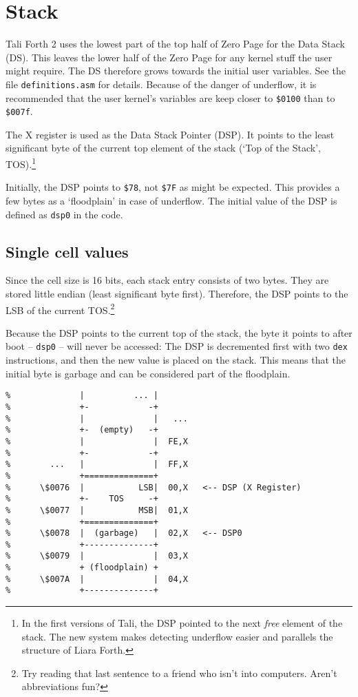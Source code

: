 
\section{Stack}

Tali Forth 2 uses the lowest part of the top half of Zero Page for the Data
Stack (DS). This leaves the lower half of the Zero Page for any kernel stuff the
user might require. The DS therefore grows towards the initial user variables.
See the file \texttt{definitions.asm} for details.  Because of the danger of
underflow, it is recommended that the user kernel's variables are keep closer to
\texttt{\$0100} than to \texttt{\$007f}.

The X register is used as the Data Stack Pointer (DSP). It points to the least
significant byte of the current top element of the stack (`Top of the Stack',
TOS).\footnote{In the first versions of Tali, the DSP pointed to the next
\textit{free} element of the stack. The new system makes detecting underflow
easier and parallels the structure of Liara Forth.}

Initially, the DSP points to \texttt{\$78}, not \texttt{\$7F} as might be
expected. This provides a few bytes as a `floodplain' in case of underflow. The
initial value of the DSP is defined as \texttt{dsp0} in the code.

\subsection{Single cell values} Since the cell size is 16 bits, each stack entry
consists of two bytes. They are stored little endian (least significant byte
first). Therefore, the DSP points to the LSB of the current TOS.\footnote{Try
reading that last sentence to a friend who isn't into computers. Aren't
abbreviations fun?}

Because the DSP points to the current top of the stack, the byte it points to
after boot -- \texttt{dsp0} -- will never be accessed: The DSP is decremented first with
two \texttt{dex} instructions, and then the new value is placed on the stack. This
means that the initial byte is garbage and can be considered part of the floodplain. 

\begin{lstlisting}[frame=single]
%              +--------------+           
%              |          ... |  
%              +-            -+ 
%              |              |   ...
%              +-  (empty)   -+
%              |              |  FE,X
%              +-            -+ 
%        ...   |              |  FF,X
%              +==============+  
%      \$0076  |           LSB|  00,X   <-- DSP (X Register)
%              +-    TOS     -+ 
%      \$0077  |           MSB|  01,X
%              +==============+ 
%      \$0078  |  (garbage)   |  02,X   <-- DSP0 
%              +--------------+           
%      \$0079  |              |  03,X
%              + (floodplain) + 
%      \$007A  |              |  04,X
%              +--------------+           
\end{lstlisting}

